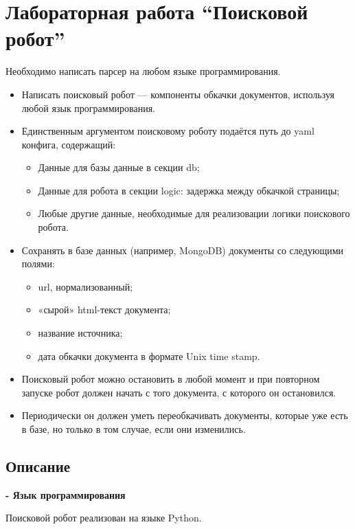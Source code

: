 \documentclass[pdf, unicode, 12pt, a4paper, oneside, fleqn]{article}
\begin{document}
\pagebreak

\section{Лабораторная работа  \enquote{Поисковой робот}}

Необходимо написать парсер на любом языке программирования.
\begin{itemize}
    \item Написать поисковый робот — компоненты обкачки документов, 
используя любой язык программирования.
    \item Единственным аргументом поисковому роботу подаётся путь до yaml конфига, содержащий:
    \begin{itemize}
        \item Данные для базы данные в секции db;
        \item Данные для робота в секции logic: задержка между обкачкой страницы;
        \item Любые другие данные, необходимые для реализовации логики поискового робота.
    \end{itemize}
    \item Сохранять в базе данных (например, MongoDB) документы со следующими полями: 
    \begin{itemize}
        \item url, нормализованный;
        \item «сырой» html-текст документа;
        \item название источника; 
        \item дата обкачки документа в формате Unix time stamp.
    \end{itemize}
    \item Поисковый робот можно остановить в любой момент и при повторном 
запуске робот должен начать с того документа, с которого он 
остановился.
    \item Периодически он должен уметь переобкачивать документы, которые 
уже есть в базе, но только в том случае, если они изменились. 
\end{itemize}

\subsection*{Описание}

\textbf{- Язык программирования}

Поисковой робот реализован на языке Python.
\end{document}
